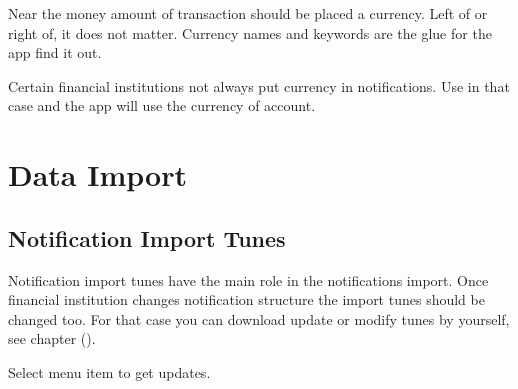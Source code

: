 \documentclass[a4paper,10pt,english]{sphinxmanual}
\begin{document}
Near the money amount of transaction should be placed a currency. Left of or right of, it does not matter.
Currency names and keywords are the glue for the app find it out.

Certain financial institutions not always put currency in notifications. Use
 in that case and the app will use the currency of account.


\chapter{Data Import}
\label{\detokenize{import:data-import}}\label{\detokenize{import:chapter-import}}\label{\detokenize{import::doc}}

\section{Notification Import Tunes}
\label{\detokenize{import:notification-import-tunes}}
Notification import tunes have the main role in the notifications import. Once
financial institution changes notification structure the import tunes should be changed too.
For that case you can download update or modify tunes by yourself, see chapter {\hyperref[\detokenize{notifications:chapter-notifications}]{}} ().

\noindent{}

\noindent{}

\noindent{}

Select menu item  to get updates.

\noindent{}

\noindent{}

\noindent{}
\end{document}
